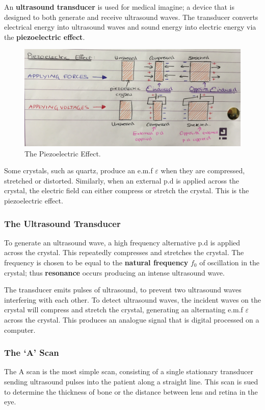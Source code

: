 An \textbf{ultrasound transducer} is used for medical imagine; a device that is designed to both generate and receive ultrasound waves. The transducer converts electrical energy into ultrasound waves and sound energy into electric energy via the \textbf{piezoelectric effect}.

\begin{figure}[h!]
    \centering
    \includegraphics[scale=0.1]{notes/images/Piezoelectric-Effect.JPG}
    \caption{The Piezoelectric Effect.}
\end{figure}
\FloatBarrier

Some crystals, such as quartz, produce an e.m.f $\varepsilon$ when they are compressed, stretched or distorted. Similarly, when an external p.d is applied across the crystal, the electric field can either compress or stretch the crystal. This is the piezoelectric effect.

\subsubsection*{The Ultrasound Transducer}

To generate an ultrasound wave, a high frequency alternative p.d is applied across the crystal. This repeatedly compresses and stretches the crystal. The frequency is chosen to be equal to the \textbf{natural frequency} $f_0$ of oscillation in the crystal; thus \textbf{resonance} occurs producing an intense ultrasound wave.

The transducer emits pulses of ultrasound, to prevent two ultrasound waves interfering with each other. To detect ultrasound waves, the incident waves on the crystal will compress and stretch the crystal, generating an alternating e.m.f $\varepsilon$ across the crystal. This produces an analogue signal that is digital processed on a computer.

\subsubsection*{The `A' Scan}
The A scan is the most simple scan, consisting of a single stationary transducer sending ultrasound pulses into the patient along a straight line. This scan is sued to determine the thickness of bone or the distance between lens and retina in the eye.


